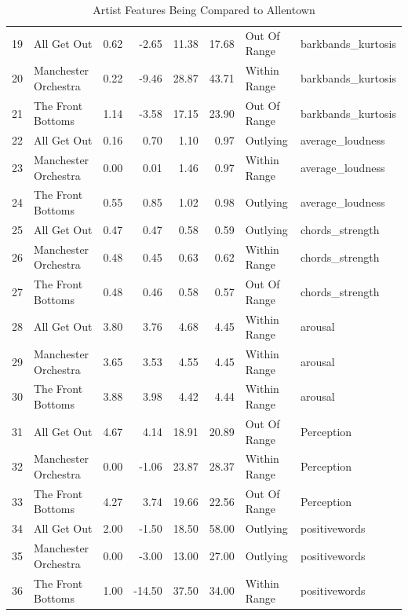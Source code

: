 \documentclass{article}\usepackage[]{graphicx}\usepackage[]{xcolor}
\begin{document}
\begin{table}[ht]
\begin{tabular}{rlrrrrll}
  19 & All Get Out & 0.62 & -2.65 & 11.38 & 17.68 & Out Of Range & barkbands\_kurtosis \\ 
  20 & Manchester Orchestra & 0.22 & -9.46 & 28.87 & 43.71 & Within Range & barkbands\_kurtosis \\ 
  21 & The Front Bottoms & 1.14 & -3.58 & 17.15 & 23.90 & Out Of Range & barkbands\_kurtosis \\ 
  22 & All Get Out & 0.16 & 0.70 & 1.10 & 0.97 & Outlying & average\_loudness \\ 
  23 & Manchester Orchestra & 0.00 & 0.01 & 1.46 & 0.97 & Within Range & average\_loudness \\ 
  24 & The Front Bottoms & 0.55 & 0.85 & 1.02 & 0.98 & Outlying & average\_loudness \\ 
  25 & All Get Out & 0.47 & 0.47 & 0.58 & 0.59 & Outlying & chords\_strength \\ 
  26 & Manchester Orchestra & 0.48 & 0.45 & 0.63 & 0.62 & Within Range & chords\_strength \\ 
  27 & The Front Bottoms & 0.48 & 0.46 & 0.58 & 0.57 & Out Of Range & chords\_strength \\ 
  28 & All Get Out & 3.80 & 3.76 & 4.68 & 4.45 & Within Range & arousal \\ 
  29 & Manchester Orchestra & 3.65 & 3.53 & 4.55 & 4.45 & Within Range & arousal \\ 
  30 & The Front Bottoms & 3.88 & 3.98 & 4.42 & 4.44 & Within Range & arousal \\ 
  31 & All Get Out & 4.67 & 4.14 & 18.91 & 20.89 & Out Of Range & Perception \\ 
  32 & Manchester Orchestra & 0.00 & -1.06 & 23.87 & 28.37 & Within Range & Perception \\ 
  33 & The Front Bottoms & 4.27 & 3.74 & 19.66 & 22.56 & Out Of Range & Perception \\ 
  34 & All Get Out & 2.00 & -1.50 & 18.50 & 58.00 & Outlying & positivewords \\ 
  35 & Manchester Orchestra & 0.00 & -3.00 & 13.00 & 27.00 & Outlying & positivewords \\ 
  36 & The Front Bottoms & 1.00 & -14.50 & 37.50 & 34.00 & Within Range & positivewords \\ 
   \hline
\end{tabular}
\caption{Artist Features Being Compared to Allentown} 
\label{compared.features}
\end{table}



\onecolumn
\end{document}
